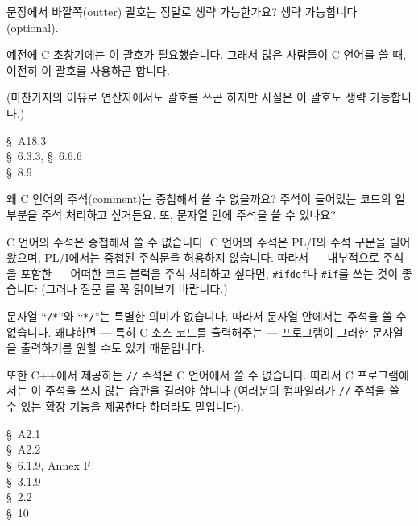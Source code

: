 \begin{faq}
	 문장에서 바깥쪽(outter) 괄호는 정말로 생략 가능한가요?
\A
	생략 가능합니다 (optional).

	예전에 C 초창기에는 이 괄호가 필요했습니다.  그래서 많은 사람들이 C
	언어를 쓸 때, 여전히 이 괄호를 사용하곤 합니다.

	(마찬가지의 이유로  연산자에서도 괄호를 쓰곤 하지만 사실은
	이 괄호도 생략 가능합니다.)

\R
	\cite{kr1} \S\ A18.3  \\
	\cite{c89} \S\ 6.3.3, \S\ 6.6.6 \\
	\cite{hs} \S\ 8.9 
\end{faq}

\begin{faq}
	왜 C 언어의 주석(comment)는 중첩해서 쓸 수 없을까요?
	주석이 들어있는 코드의 일부분을 주석 처리하고 싶거든요.
	또, 문자열 안에 주석을 쓸 수 있나요?

\A
	C 언어의 주석은 중첩해서 쓸 수 없습니다.  C 언어의 주석은 PL/I의
	주석 구문을 빌어왔으며, PL/I에서는 중첩된 주석문을 허용하지 않습니다.
	따라서 --- 내부적으로 주석을 포함한 --- 어떠한 코드 블럭을 주석 
	처리하고 싶다면, \verb+#ifdef+나 \verb+#if+를 쓰는 것이 좋습니다
	(그러나 질문 를 꼭 읽어보기 바랍니다.)

	문자열 ``\verb+/*+''와 ``\verb+*/+''는 특별한 의미가 없습니다.
	따라서 문자열 안에서는 주석을 쓸 수 없습니다.
	왜냐하면 --- 특히 C 소스 코드를 출력해주는 --- 프로그램이 그러한
	문자열을 출력하기를 원할 수도 있기 때문입니다.
	
	또한 C++에서 제공하는 \verb+//+ 주석은 C 언어에서 쓸 수 없습니다.
	따라서 C 프로그램에서는 이 주석을 쓰지 않는 습관을 길러야 합니다
	(여러분의 컴파일러가 \verb+//+ 주석을 쓸 수 있는 확장 기능을 제공한다
	하더라도 말입니다).

\R
	\cite{kr1} \S\ A2.1  \\
	\cite{kr2} \S\ A2.2  \\
	\cite{c89} \S\ 6.1.9, Annex F \\
	\cite{rationale} \S\ 3.1.9 \\
	\cite{hs} \S\ 2.2  \\
	\cite{pcs} \S\ 10 
\end{faq}

